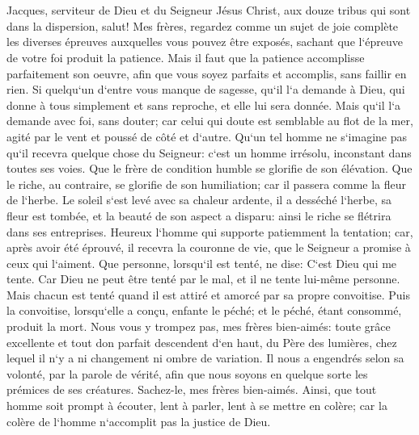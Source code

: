 

\chapter{}

\verse Jacques, serviteur de Dieu et du Seigneur Jésus Christ, aux douze tribus qui sont dans la dispersion, salut! 
\verse Mes frères, regardez comme un sujet de joie complète les diverses épreuves auxquelles vous pouvez être exposés, 
\verse sachant que l`épreuve de votre foi produit la patience. 
\verse Mais il faut que la patience accomplisse parfaitement son oeuvre, afin que vous soyez parfaits et accomplis, sans faillir en rien. 
\verse Si quelqu`un d`entre vous manque de sagesse, qu`il l`a demande à Dieu, qui donne à tous simplement et sans reproche, et elle lui sera donnée. 
\verse Mais qu`il l`a demande avec foi, sans douter; car celui qui doute est semblable au flot de la mer, agité par le vent et poussé de côté et d`autre. 
\verse Qu`un tel homme ne s`imagine pas qu`il recevra quelque chose du Seigneur: 
\verse c`est un homme irrésolu, inconstant dans toutes ses voies. 
\verse Que le frère de condition humble se glorifie de son élévation. 
\verse Que le riche, au contraire, se glorifie de son humiliation; car il passera comme la fleur de l`herbe. 
\verse Le soleil s`est levé avec sa chaleur ardente, il a desséché l`herbe, sa fleur est tombée, et la beauté de son aspect a disparu: ainsi le riche se flétrira dans ses entreprises. 
\verse Heureux l`homme qui supporte patiemment la tentation; car, après avoir été éprouvé, il recevra la couronne de vie, que le Seigneur a promise à ceux qui l`aiment. 
\verse Que personne, lorsqu`il est tenté, ne dise: C`est Dieu qui me tente. Car Dieu ne peut être tenté par le mal, et il ne tente lui-même personne. 
\verse Mais chacun est tenté quand il est attiré et amorcé par sa propre convoitise. 
\verse Puis la convoitise, lorsqu`elle a conçu, enfante le péché; et le péché, étant consommé, produit la mort. 
\verse Nous vous y trompez pas, mes frères bien-aimés: 
\verse toute grâce excellente et tout don parfait descendent d`en haut, du Père des lumières, chez lequel il n`y a ni changement ni ombre de variation. 
\verse Il nous a engendrés selon sa volonté, par la parole de vérité, afin que nous soyons en quelque sorte les prémices de ses créatures. 
\verse Sachez-le, mes frères bien-aimés. Ainsi, que tout homme soit prompt à écouter, lent à parler, lent à se mettre en colère; 
\verse car la colère de l`homme n`accomplit pas la justice de Dieu. 
